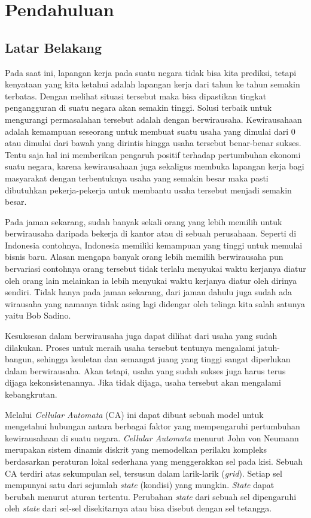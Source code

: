 \chapter{Pendahuluan}
\label{chap:intro}
   
\section{Latar Belakang}
\label{sec:label}

Pada saat ini, lapangan kerja pada suatu negara tidak bisa kita prediksi, tetapi kenyataan yang kita ketahui adalah lapangan kerja dari tahun ke tahun semakin terbatas. Dengan melihat situasi tersebut maka bisa dipastikan tingkat pengangguran di suatu negara akan semakin tinggi. Solusi terbaik untuk mengurangi permasalahan tersebut adalah dengan berwirausaha. Kewirausahaan adalah kemampuan seseorang untuk membuat suatu usaha yang dimulai dari 0 atau dimulai dari bawah yang dirintis hingga usaha tersebut benar-benar sukses. Tentu saja hal ini memberikan pengaruh positif terhadap pertumbuhan ekonomi suatu negara, karena kewirausahaan juga sekaligus membuka lapangan kerja bagi masyarakat dengan terbentuknya usaha yang semakin besar maka pasti dibutuhkan pekerja-pekerja untuk membantu usaha tersebut menjadi semakin besar.

 
Pada jaman sekarang, sudah banyak sekali orang yang lebih memilih untuk berwirausaha daripada bekerja di kantor atau di sebuah perusahaan. Seperti di Indonesia contohnya, Indonesia memiliki kemampuan yang tinggi untuk memulai bisnis baru. Alasan mengapa banyak orang lebih memilih berwirausaha pun bervariasi contohnya orang tersebut tidak terlalu menyukai waktu kerjanya diatur oleh orang lain melainkan ia lebih menyukai waktu kerjanya diatur oleh dirinya sendiri. Tidak hanya pada jaman sekarang, dari jaman dahulu juga sudah ada wirausaha yang namanya tidak asing lagi didengar oleh telinga kita salah satunya yaitu Bob Sadino.


Kesuksesan dalam berwirausaha juga dapat dilihat dari usaha yang sudah dilakukan. Proses untuk meraih usaha tersebut tentunya mengalami jatuh-bangun, sehingga keuletan dan semangat juang yang tinggi sangat diperlukan dalam berwirausaha. Akan tetapi, usaha yang sudah sukses juga harus terus dijaga kekonsistenannya. Jika tidak dijaga, usaha tersebut akan mengalami kebangkrutan. 


Melalui \textit{Cellular Automata} (CA) ini dapat dibuat sebuah model untuk mengetahui hubungan antara berbagai faktor yang mempengaruhi pertumbuhan kewirausahaan di suatu negara. \textit{Cellular Automata} menurut John von Neumann merupakan sistem dinamis diskrit yang memodelkan perilaku kompleks berdasarkan peraturan lokal sederhana yang menggerakkan sel pada kisi. Sebuah CA terdiri atas sekumpulan sel, tersusun dalam larik-larik (\textit{grid}). Setiap sel mempunyai satu dari sejumlah \textit{state} (kondisi) yang mungkin. \textit{State} dapat berubah menurut aturan tertentu. Perubahan \textit{state} dari sebuah sel dipengaruhi oleh \textit{state} dari sel-sel disekitarnya atau bisa disebut dengan sel tetangga.


